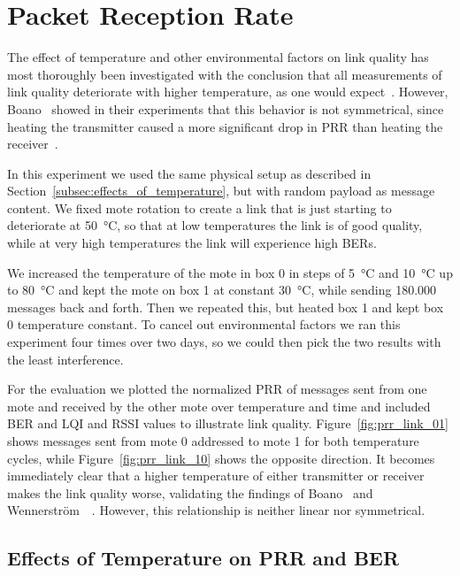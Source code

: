\section{Packet Reception Rate}
\label{sec:packet_reception_rate}

The effect of temperature and other environmental factors on link quality has most thoroughly been investigated with the conclusion that all measurements of link quality deteriorate with higher temperature, as one would expect~\cite{Wennerstrom2013, Boano2013, Boano2014, Zuniga2013}.
However, Boano~\etal{} showed in their experiments that this behavior is not symmetrical, since heating the transmitter caused a more significant drop in \ac{PRR} than heating the receiver~\cite{Boano2013}.

In this experiment we used the same physical setup as described in Section~\ref{subsec:effects_of_temperature}, but with random payload as message content.
We fixed mote rotation to create a link that is just starting to deteriorate at \SI{50}{\celsius}, so that at low temperatures the link is of good quality, while at very high temperatures the link will experience high \ac{BER}s.

We increased the temperature of the mote in box 0 in steps of \SI{5}{\celsius} and \SI{10}{\celsius} up to \SI{80}{\celsius} and kept the mote on box 1 at constant \SI{30}{\celsius}, while sending 180.000 messages back and forth.
Then we repeated this, but heated box 1 and kept box 0 temperature constant.
To cancel out environmental factors we ran this experiment four times over two days, so we could then pick the two results with the least interference.

For the evaluation we plotted the normalized \ac{PRR} of messages sent from one mote and received by the other mote over temperature and time and included \ac{BER} and \ac{LQI} and \ac{RSSI} values to illustrate link quality.
Figure~\ref{fig:prr_link_01} shows messages sent from mote 0 addressed to mote 1 for both temperature cycles, while Figure~\ref{fig:prr_link_10} shows the opposite direction.
It becomes immediately clear that a higher temperature of either transmitter or receiver makes the link quality worse, validating the findings of Boano~\etal{} and Wennerstr{\"o}m~\etal~\cite{Boano2013, Wennerstrom2013}.
However, this relationship is neither linear nor symmetrical.


\subsection{Effects of Temperature on \acs{PRR} and \acs{BER}}

